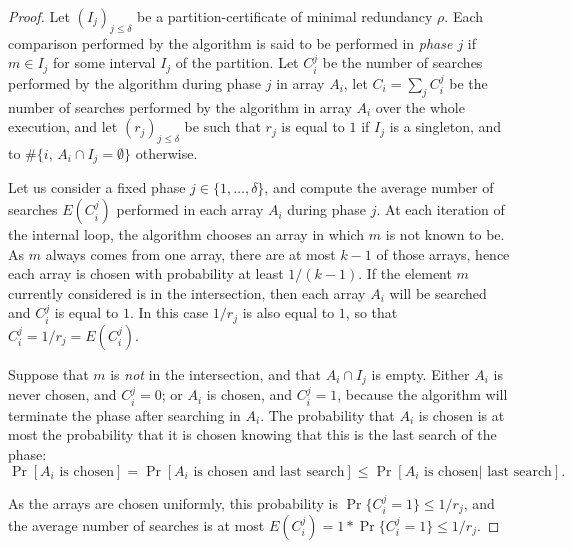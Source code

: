 \begin{proof}
Let $(I_j)_{j\leq \delta}$ be a partition-certificate of minimal
redundancy $\rho$.
%
Each comparison performed by the algorithm is said to be performed in
{\em phase $j$} if $m\in I_j$ for some interval $I_j$ of the
partition.
%
Let $C_i^j$ be the number of searches performed by the algorithm
during phase $j$ in array $A_i$,
%
let $C_i=\sum_j C_i^j$ be the number of searches performed by the algorithm in
 array $A_i$ over the whole execution,
%
and let $(r_j)_{j\leq\delta}$ be such that $r_j$ is equal to $1$ if
$I_j$ is a singleton, and to $\#\{i,\,A_i\cap I_j=\emptyset\}$
otherwise.



Let us consider a fixed phase $j\in\{1,\ldots,\delta\}$, and
compute the average number of searches $E(C_i^j)$ performed in each
array $A_i$ during phase $j$.
%
At each iteration of the internal loop, the algorithm chooses an array
in which $m$ is not known to be.
%
As $m$ always comes from one array, there are at most $k-1$ of those
arrays, hence each array is chosen with probability at least
$1/(k-1)$.
%
If the element $m$ currently considered is in the intersection, 
then each array $A_i$ will be searched and $C_i^j$ is equal to $1$.
%
In this case $1/r_j$ is also equal to $1$, so that
$C_i^j{=}1/r_j{=}E(C_i^j)$.

Suppose that $m$ is {\em not} in the intersection, and that $A_i\cap
I_j$ is empty.
%
Either $A_i$ is never chosen, and $C_i^j=0$; or $A_i$ is chosen, and
$C_i^j=1$, because the algorithm will terminate the phase after
searching in $A_i$.
%
The probability that $A_i$ is chosen is at most the probability that
it is chosen knowing that this is the last search of the phase:
$$\Pr[A_i\mbox{ is chosen}]  = \Pr[A_i\mbox{ is chosen and last search}]
\leq \Pr[A_i\mbox{ is chosen} | \mbox{ last search}].$$	      

As the arrays are chosen uniformly, this probability is
$\Pr\{C_i^j=1\}\leq{1/r_j}$, and the average number of searches is at
most $E(C_i^j)=1*\Pr\{C_i^j=1\}\leq{1/r_j}$.



\end{proof}
